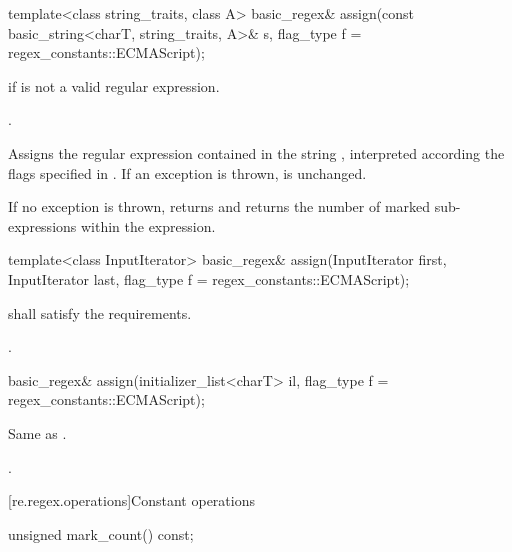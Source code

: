 %
\begin{itemdecl}
template<class string_traits, class A>
  basic_regex& assign(const basic_string<charT, string_traits, A>& s,
                      flag_type f = regex_constants::ECMAScript);
\end{itemdecl}

\begin{itemdescr}
\pnum
\throws  {} if  is not a valid regular expression.

\pnum
\returns {}.

\pnum
\effects  Assigns the regular expression contained in the string
, interpreted according the flags specified in .
If an exception is thrown,  is unchanged.

\pnum
\ensures
If no exception is thrown,
 returns  and 
returns the number of marked sub-expressions within the expression.
\end{itemdescr}

%
\begin{itemdecl}
template<class InputIterator>
  basic_regex& assign(InputIterator first, InputIterator last,
                      flag_type f = regex_constants::ECMAScript);
\end{itemdecl}

\begin{itemdescr}
\pnum
\requires
{} shall satisfy the
 requirements.

\pnum
\returns {}.
\end{itemdescr}

%
\begin{itemdecl}
basic_regex& assign(initializer_list<charT> il,
                    flag_type f = regex_constants::ECMAScript);
\end{itemdecl}

\begin{itemdescr}
\pnum
\effects Same as .

\pnum
\returns {}.
\end{itemdescr}


[re.regex.operations]{Constant operations}

%
\begin{itemdecl}
unsigned mark_count() const;
\end{itemdecl}

